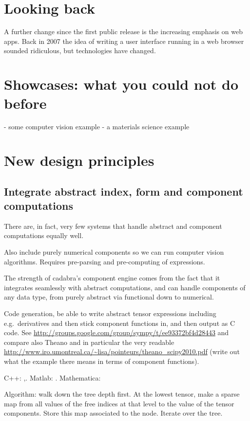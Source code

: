 \documentclass[11pt]{article}
\begin{document}
\section{Looking back}


A further change since the first public release is the increasing
emphasis on web apps. Back in 2007 the idea of writing a user
interface running in a web browser sounded ridiculous, but
technologies have changed. 

\section{Showcases: what you could not do before}

- some computer vision example
- a materials science example


\section{New design principles}
\subsection{Integrate abstract index, form and component computations}

There are, in fact, very few systems that handle abstract and
component computations equally well.

Also include purely numerical components so we can run computer vision
algorithms. Requires pre-parsing and pre-computing of expressions.

The strength of cadabra's component engine comes from the fact that it
integrates seamlessly with abstract computations, and can handle
components of any data type, from purely abstract via functional down
to numerical.

Code generation, be able to write abstract tensor expressions
including e.g.~derivatives and then stick component functions in, and
then output as C code. See
\url{http://groups.google.com/group/sympy/t/ee93372bf4d28443}
and compare also Theano and in particular the
very readable \url{http://www.iro.umontreal.ca/~lisa/pointeurs/theano_scipy2010.pdf}
(write out what the example there means in terms of component functions).

C++: \cite{ltensor},\cite{ftensor}.
Matlab: \cite{TTB_Software}.
Mathematica: \cite{kranc}

Algorithm: walk down the tree depth first. At the lowest tensor, make
a sparse map from all values of the free indices at that level to the
value of the tensor components. Store this map associated to the
node. Iterate over the tree.
\end{document}
